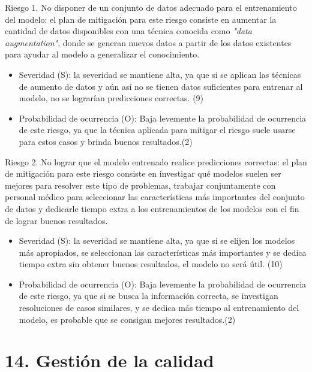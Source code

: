 \documentclass[
11pt, %
]{charter}
\begin{document}
Riesgo 1. No disponer de un conjunto de datos adecuado para el entrenamiento del modelo: el plan de mitigación para este riesgo consiste en aumentar la cantidad de datos disponibles con una técnica conocida como \textit{"data augmentation"}, donde se generan nuevos datos a partir de los datos existentes para ayudar al modelo a generalizar el conocimiento.
\begin{itemize}
	\item Severidad (S): la severidad se mantiene alta, ya que si se aplican las técnicas de aumento de datos y aún así no se tienen datos suficientes para entrenar al modelo, no se lograrían predicciones correctas. (9)
	\item Probabilidad de ocurrencia (O): Baja levemente la probabilidad de ocurrencia de este riesgo, ya que la técnica aplicada para mitigar el riesgo suele usarse para estos casos y brinda buenos resultados.(2)
\end{itemize}

Riesgo 2. No lograr que el modelo entrenado realice predicciones correctas: el plan de mitigación para este riesgo consiste en investigar qué modelos suelen ser mejores para resolver este tipo de problemas, trabajar conjuntamente con personal médico para seleccionar las características más importantes del conjunto de datos y dedicarle tiempo extra a los entrenamientos de los modelos con el fin de lograr buenos resultados.
\begin{itemize}
	\item Severidad (S): la severidad se mantiene alta, ya que si se elijen los modelos más apropiados, se seleccionan las características más importantes y se dedica tiempo extra sin obtener buenos resultados, el modelo no será útil. (10)
	\item Probabilidad de ocurrencia (O): Baja levemente la probabilidad de ocurrencia de este riesgo, ya que si se busca la información correcta, se investigan resoluciones de casos similares, y se dedica más tiempo al entrenamiento del modelo, es probable que se consigan mejores resultados.(2)
\end{itemize}

\section{14. Gestión de la calidad}
\label{sec:calidad}
\end{document}
